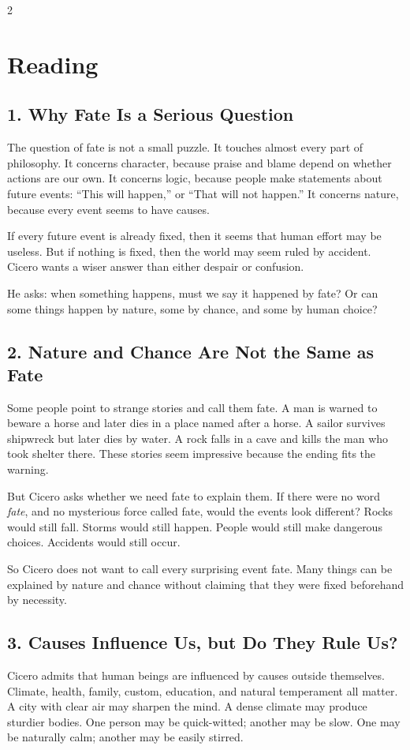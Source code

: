 \documentclass[12pt]{article}
\begin{document}
\begin{multicols}{2}
\section*{Reading}

\subsection*{1. Why Fate Is a Serious Question}
The question of fate is not a small puzzle. It touches almost every part of philosophy. It concerns character, because praise and blame depend on whether actions are our own. It concerns logic, because people make statements about future events: ``This will happen,'' or ``That will not happen.'' It concerns nature, because every event seems to have causes.

If every future event is already fixed, then it seems that human effort may be useless. But if nothing is fixed, then the world may seem ruled by accident. Cicero wants a wiser answer than either despair or confusion.

He asks: when something happens, must we say it happened by fate? Or can some things happen by nature, some by chance, and some by human choice?

\subsection*{2. Nature and Chance Are Not the Same as Fate}
Some people point to strange stories and call them fate. A man is warned to beware a horse and later dies in a place named after a horse. A sailor survives shipwreck but later dies by water. A rock falls in a cave and kills the man who took shelter there. These stories seem impressive because the ending fits the warning.

But Cicero asks whether we need fate to explain them. If there were no word \textit{fate}, and no mysterious force called fate, would the events look different? Rocks would still fall. Storms would still happen. People would still make dangerous choices. Accidents would still occur.

So Cicero does not want to call every surprising event fate. Many things can be explained by nature and chance without claiming that they were fixed beforehand by necessity.

\subsection*{3. Causes Influence Us, but Do They Rule Us?}
Cicero admits that human beings are influenced by causes outside themselves. Climate, health, family, custom, education, and natural temperament all matter. A city with clear air may sharpen the mind. A dense climate may produce sturdier bodies. One person may be quick-witted; another may be slow. One may be naturally calm; another may be easily stirred.


\end{multicols}
\end{document}
